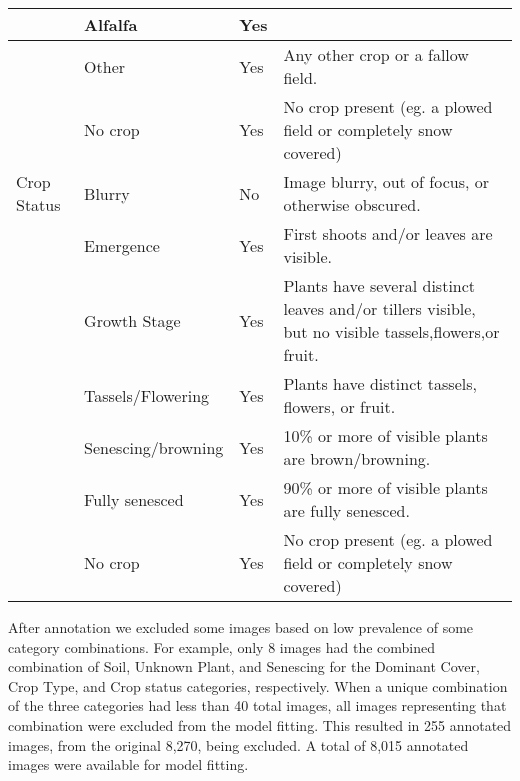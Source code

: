 \documentclass[remotesensing,article,submit,moreauthors,pdftex]{Definitions/mdpi}
\begin{document}
\begin{table}[H]
\begin{tabular}{|p{2cm}|p{3cm}|p{2cm}|p{5cm}|}
               & Alfalfa            & Yes                   &                                                                                                      \\ \hline
               & Other              & Yes                   & Any other crop or a fallow field.                                                                    \\ \hline
               & No crop            & Yes                   & No crop present (eg. a plowed field or completely snow covered)                                      \\ \hline
Crop Status    & Blurry             & No                    & Image blurry, out of focus, or otherwise obscured.                                                   \\ \hline
               & Emergence          & Yes                   & First shoots and/or leaves are visible.                                                              \\ \hline
               & Growth Stage       & Yes                   & Plants have several distinct leaves and/or tillers visible, but no visible tassels,flowers,or fruit. \\ \hline
               & Tassels/Flowering  & Yes                   & Plants have distinct tassels, flowers, or fruit.                                                     \\ \hline
               & Senescing/browning & Yes                   & 10\% or more of visible plants are brown/browning.                                                   \\ \hline
               & Fully senesced     & Yes                   & 90\% or more of visible plants are fully senesced.                                                   \\ \hline
               & No crop            & Yes                   & No crop present (eg. a plowed field or completely snow covered)                                      \\ \hline
\end{tabular}
\label{table1}
\end{table}

After annotation we excluded some images based on low prevalence of some category combinations. For example, only 8 images had the combined combination of Soil, Unknown Plant, and Senescing for the Dominant Cover, Crop Type, and Crop status categories, respectively. When a unique combination of the three categories had less than 40 total images, all images representing that combination were excluded from the model fitting. This resulted in 255 annotated images, from the original 8,270, being excluded. A total of 8,015 annotated images were available for model fitting.
\end{document}
